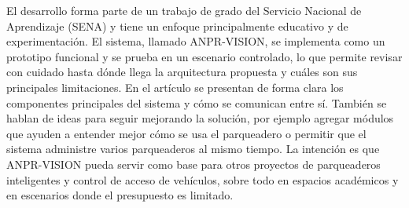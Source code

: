El desarrollo forma parte de un trabajo de grado del Servicio Nacional de Aprendizaje (SENA) y tiene un enfoque principalmente educativo y de experimentación. El sistema, llamado ANPR-VISION, se implementa como un prototipo funcional y se prueba en un escenario controlado, lo que permite revisar con cuidado hasta dónde llega la arquitectura propuesta y cuáles son sus principales limitaciones. En el artículo se presentan de forma clara los componentes principales del sistema y cómo se comunican entre sí. También se hablan de ideas para seguir mejorando la solución, por ejemplo agregar módulos que ayuden a entender mejor cómo se usa el parqueadero o permitir que el sistema administre varios parqueaderos al mismo tiempo. La intención es que ANPR-VISION pueda servir como base para otros proyectos de parqueaderos inteligentes y control de acceso de vehículos, sobre todo en espacios académicos y en escenarios donde el presupuesto es limitado.

